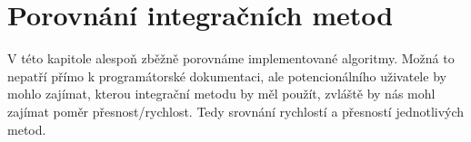 \chapter{Porovnání integračních metod}
V této kapitole alespoň zběžně porovnáme implementované algoritmy. Možná to nepatří přímo k programátorské dokumentaci, ale potencionálního uživatele by mohlo zajímat, kterou integrační metodu by měl použít, zvláště by nás mohl zajímat poměr přesnost/rychlost. Tedy srovnání rychlostí a přesností jednotlivých metod.